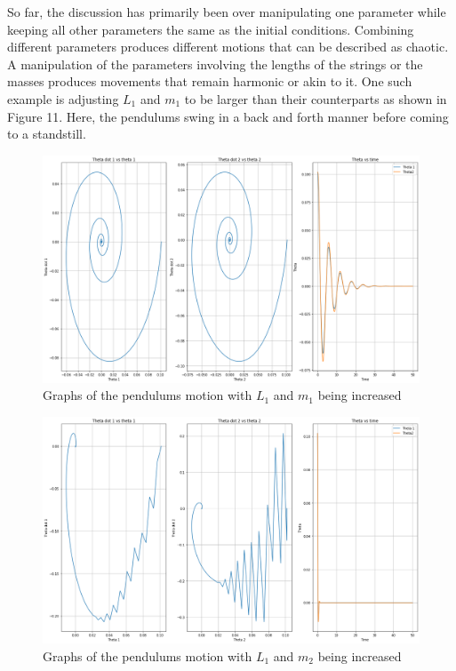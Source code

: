 \documentclass[linenumbers,RNAAS,trackchanges]{aastex631}
\begin{document}
So far, the discussion has primarily been over manipulating one parameter while keeping all other parameters the same as the initial conditions. Combining different parameters produces different motions that can be described as chaotic. A manipulation of the parameters involving the lengths of the strings or the masses produces movements that remain harmonic or akin to it. One such example is adjusting $L_1$ and $m_1$ to be larger than their counterparts as shown in Figure 11. Here, the pendulums swing in a back and forth manner before coming to a standstill. 
\begin{figure}[H]
    \centering
    \centering
    \includegraphics[scale=.30]{l1m1.png}
    \caption{Graphs of the pendulums motion with $L_1$ and $m_1$ being increased}
    \label{fig:code}
\end{figure}
\begin{figure}[H]
    \centering
    \centering
    \includegraphics[scale=.30]{l1m2.png}
    \caption{Graphs of the pendulums motion with $L_1$ and $m_2$ being increased}
    \label{fig:code}
\end{figure}
\end{document}
